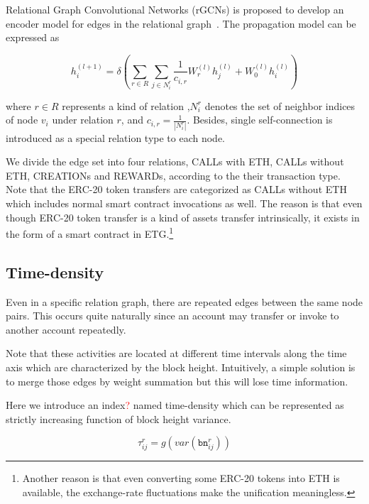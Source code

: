 Relational Graph Convolutional Networks (rGCNs) is proposed to develop an encoder model for edges in the relational graph~\cite{schlichtkrull2018modeling}. The propagation model can be expressed as

\begin{equation}
h_i^{(l+1)}=\delta(\sum_{r\in R} \sum_{j \in N_i^r} \frac{1}{c_{i,r}}W_r^{(l)}h_j^{(l)}+W_0^{(l)}h_i^{(l)})
\label{eq:rgcn}
\end{equation}

where $r \in R$ represents a kind of relation ,$N_i^r$ denotes the set of neighbor indices of node $v_i$ under relation $r$, and $c_{i,r}=\frac{1}{|N_i^r|}$. Besides, single self-connection is introduced as a special relation type to each node. %

We divide the edge set into four relations, CALLs with ETH, CALLs without ETH, CREATIONs and REWARDs, according to the their transaction type. Note that the ERC-20 token transfers are categorized as CALLs without ETH which includes normal smart contract invocations as well. The reason is that even though ERC-20 token transfer is a kind of assets transfer intrinsically, it exists in the form of a smart contract in ETG.\footnote{Another reason is that even converting some ERC-20 tokens into ETH is available, the exchange-rate fluctuations make the unification meaningless.} %


\subsection{Time-density}
\label{section:time}
Even in a specific relation graph, there are repeated edges between the same node pairs. This occurs quite naturally since an account may transfer or invoke to another account repeatedly.

Note that these activities are located at different time intervals along the time axis which are characterized by the block height. Intuitively, a simple solution is to merge those edges by weight summation but this will lose time information. 

Here we introduce an index\textcolor{red}{?} named time-density which can be represented as strictly increasing function of block height variance.

\begin{equation}
\tau_{ij}^r=g(var(\texttt{bn}_{ij}^r))
\label{eq:time}
\end{equation}

